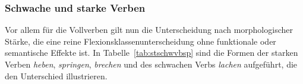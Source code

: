 \subsubsection{Schwache und starke Verben}

Vor allem für die Vollverben gilt nun die Unterscheidung nach morphologischer Stärke, die eine reine Flexionsklassenunterscheidung ohne funktionale oder semantische Effekte ist.
In Tabelle~\ref{tab:stschwvbsp} sind die Formen der starken Verben \textit{heben}, \textit{springen}, \textit{brechen} und des schwachen Verbs \textit{lachen} aufgeführt, die den Unterschied illustrieren.

\begin{table}
  \caption{Beispielformen starker und schwacher Verben}
  \label{tab:stschwvbsp}
\end{table}


